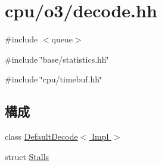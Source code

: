 \hypertarget{decode_8hh}{
\section{cpu/o3/decode.hh}
\label{decode_8hh}
}
{\ttfamily \#include $<$queue$>$}\par
{\ttfamily \#include \char`\"{}base/statistics.hh\char`\"{}}\par
{\ttfamily \#include \char`\"{}cpu/timebuf.hh\char`\"{}}\par
\subsection*{構成}
\begin{DoxyCompactItemize}
\item 
class \hyperlink{classDefaultDecode}{DefaultDecode$<$ Impl $>$}
\item 
struct \hyperlink{structDefaultDecode_1_1Stalls}{Stalls}
\end{DoxyCompactItemize}

